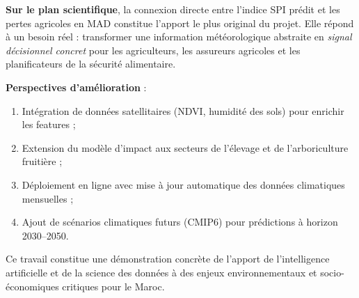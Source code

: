 \documentclass[12pt,a4paper]{report}
\begin{document}
\textbf{Sur le plan scientifique}, la connexion directe entre l'indice SPI prédit et les pertes agricoles en MAD constitue l'apport le plus original du projet. Elle répond à un besoin réel : transformer une information météorologique abstraite en \textit{signal décisionnel concret} pour les agriculteurs, les assureurs agricoles et les planificateurs de la sécurité alimentaire.

\textbf{Perspectives d'amélioration} :
\begin{enumerate}
    \item Intégration de données satellitaires (NDVI, humidité des sols) pour enrichir les features ;
    \item Extension du modèle d'impact aux secteurs de l'élevage et de l'arboriculture fruitière ;
    \item Déploiement en ligne avec mise à jour automatique des données climatiques mensuelles ;
    \item Ajout de scénarios climatiques futurs (CMIP6) pour prédictions à horizon 2030--2050.
\end{enumerate}

\vspace{1cm}
\noindent Ce travail constitue une démonstration concrète de l'apport de l'intelligence artificielle et de la science des données à des enjeux environnementaux et socio-économiques critiques pour le Maroc.
\end{document}

